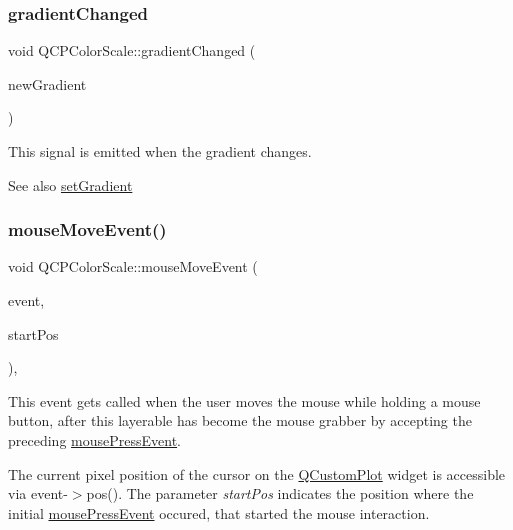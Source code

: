 \subsubsection{\texorpdfstring{gradient\+Changed}{gradientChanged}}
{\footnotesize\ttfamily void Q\+C\+P\+Color\+Scale\+::gradient\+Changed (\begin{DoxyParamCaption}\item[{const \hyperlink{classQCPColorGradient}{Q\+C\+P\+Color\+Gradient} \&}]{new\+Gradient }\end{DoxyParamCaption})\hspace{0.3cm}{\ttfamily [signal]}}

This signal is emitted when the gradient changes.

\begin{DoxySeeAlso}{See also}
\hyperlink{classQCPColorScale_a1f29583bb6f1e7f473b62fb712be3940}{set\+Gradient} 
\end{DoxySeeAlso}
\mbox{\label{classQCPColorScale_a3b2bd79725aefaf2630fc76e90939442}} 
\subsubsection{\texorpdfstring{mouse\+Move\+Event()}{mouseMoveEvent()}}
{\footnotesize\ttfamily void Q\+C\+P\+Color\+Scale\+::mouse\+Move\+Event (\begin{DoxyParamCaption}\item[{Q\+Mouse\+Event $\ast$}]{event,  }\item[{const Q\+PointF \&}]{start\+Pos }\end{DoxyParamCaption})\hspace{0.3cm}{\ttfamily [protected]}, {\ttfamily [virtual]}}

This event gets called when the user moves the mouse while holding a mouse button, after this layerable has become the mouse grabber by accepting the preceding \hyperlink{classQCPColorScale_a91f633b97ffcd57fdf8cd814974c20e6}{mouse\+Press\+Event}.

The current pixel position of the cursor on the \hyperlink{classQCustomPlot}{Q\+Custom\+Plot} widget is accessible via {\ttfamily event-\/$>$pos()}. The parameter {\itshape start\+Pos} indicates the position where the initial \hyperlink{classQCPColorScale_a91f633b97ffcd57fdf8cd814974c20e6}{mouse\+Press\+Event} occured, that started the mouse interaction.

